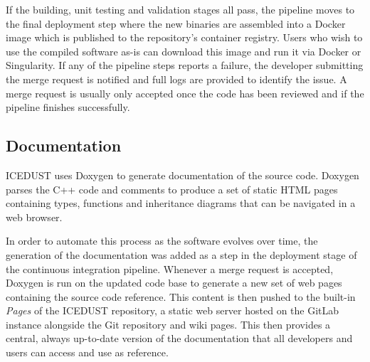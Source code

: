 If the building, unit testing and validation stages all pass, the pipeline moves
to the final deployment step where the new binaries are assembled into a Docker
image which is published to the repository's container registry. Users who wish
to use the compiled software as-is can download this image and run it via Docker
or Singularity. If any of the pipeline steps reports a failure, the developer
submitting the merge request is notified and full logs are provided to identify
the issue. A merge request is usually only accepted once the code has been
reviewed and if the pipeline finishes successfully.

\subsection{Documentation}
ICEDUST uses Doxygen to generate documentation of the source code. Doxygen
parses the C++ code and comments to produce a set of static HTML pages
containing types, functions and inheritance diagrams that can be navigated in a
web browser.

In order to automate this process as the software evolves over time, the
generation of the documentation was added as a step in the deployment stage of
the continuous integration pipeline. Whenever a merge request is accepted,
Doxygen is run on the updated code base to generate a new set of web pages
containing the source code reference. This content is then pushed to the
built-in \emph{Pages} of the ICEDUST repository, a static web server hosted on
the GitLab instance alongside the Git repository and wiki pages. This then
provides a central, always up-to-date version of the documentation that all
developers and users can access and use as reference.



